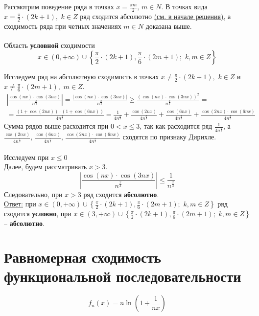 \documentclass[a5paper, 10pt]{article}
\theoremstyle{definition}
\theoremstyle{plain}
\theoremstyle{remark}
\begin{document}
Рассмотрим поведение ряда в точках $x = \frac{\pi m}{2}, \, m \in N$. В точках вида $x = \frac{\pi}{2} \cdot (2k + 1), \,\, k \in  Z$ ряд сходится абсолютно \hyperlink{pdf}{ (см. в начале решения)}, а сходимость ряда при четных значениях $m \in N$ доказана выше.\\\\
Область \textbf{условной} сходимости  $$x \in (0, + \infty)  \cup \left\{  \frac{\pi}{2} \cdot (2k + 1), \frac{\pi}{6} \cdot (2m + 1); \,\, k ,  m\in Z\right\}$$

Исследуем ряд на абсолютную сходимость в точках  $x \neq \frac{\pi}{2} \cdot (2k + 1), \,\, k \in Z$  и $x \neq \frac{\pi}{6} \cdot (2m + 1), \,\, m \in Z$.
\begin{multline*}
\left| \frac{\cos( nx) \cdot \cos (3nx) }{n^{\frac{x}{3}}}  \right| =  \frac{\left|\cos( nx) \cdot \cos (3nx)\right| }{n^{\frac{x}{3}}}
\geq   \frac{\left(\cos( nx) \cdot \cos (3nx)\right)^2 }{n^{\frac{x}{3}}} = \\
= \frac{\left(1 + \cos(2 nx)\right) \cdot \left(1 +  \cos (6nx)\right)}{4n^{\frac{x}{3}}} =
\frac{1}{4n^{\frac{x}{3}}}+\frac{ \cos(2 nx)}{4n^{\frac{x}{3}}}+\frac{\cos (6nx)}{4n^{\frac{x}{3}}}+\frac{\cos(2 nx) \cdot \cos (6nx)}{4n^{\frac{x}{3}}}
\end{multline*}
Сумма рядов выше расходится при $0 <x \leq 3$, так как расходится ряд $\frac{1}{4n^{\frac{x}{3}}}$, а $\frac{ \cos(2 nx)}{4n^{\frac{x}{3}}}, \,\frac{\cos (6nx)}{4n^{\frac{x}{3}}}, \, \frac{\cos(2 nx) \cdot \cos (6nx)}{4n^{\frac{x}{3}}}$  сходятся по признаку Дирихле.\\\\
Исследуем при $x \leq 0$\\
 Далее, будем рассматривать $x > 3$.
\begin{equation*}
\left| \frac{\cos( nx) \cdot \cos (3nx) }{n^{\frac{x}{3}}}  \right| \leq  \frac{1}{n^{\frac{x}{3}}}
\end{equation*}
Следовательно, при $x > 3$ ряд сходится \textbf{абсолютно}.\\
 
\underline{Ответ:} при $x \in (0, + \infty)  \cup \left\{  \frac{\pi}{2} \cdot (2k + 1), \frac{\pi}{6} \cdot (2m + 1); \,\, k ,  m\in Z\right\}$  ряд сходится \textbf{условно}, при $x \in (3, + \infty)  \cup \left\{  \frac{\pi}{2} \cdot (2k + 1), \frac{\pi}{6} \cdot (2m + 1); \,\, k ,  m\in Z\right\}$  -- \textbf{абсолютно}.


\newpage
\section{Равномерная сходимость функциональной последовательности}
\begin{equation*}
f_n (x) = n \ln \left( 1+ \frac{1}{nx} \right)
\end{equation*}
\end{document}

